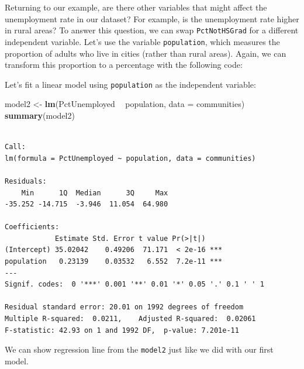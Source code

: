 \documentclass[]{article}
\newenvironment{Shaded}{\begin{snugshade}}{\end{snugshade}}
\newcommand{\DataTypeTok}[1]{\textcolor[rgb]{0.13,0.29,0.53}{#1}}
\newcommand{\DecValTok}[1]{\textcolor[rgb]{0.00,0.00,0.81}{#1}}
\newcommand{\KeywordTok}[1]{\textcolor[rgb]{0.13,0.29,0.53}{\textbf{#1}}}
\newcommand{\NormalTok}[1]{#1}
\newcommand{\OperatorTok}[1]{\textcolor[rgb]{0.81,0.36,0.00}{\textbf{#1}}}
\newcommand{\StringTok}[1]{\textcolor[rgb]{0.31,0.60,0.02}{#1}}
\begin{document}
Returning to our example, are there other variables that might affect the unemployment rate in our dataset? For example, is the unemployment rate higher in rural areas? To answer this question, we can swap \texttt{PctNotHSGrad} for a different independent variable. Let's use the variable \texttt{population}, which measures the proportion of adults who live in cities (rather than rural areas). Again, we can transform this proportion to a percentage with the following code:

\begin{Shaded}
\end{Shaded}

Let's fit a linear model using \texttt{population} as the independent variable:

\begin{Shaded}
\begin{Highlighting}[]
\NormalTok{model2 <-}\StringTok{ }\KeywordTok{lm}\NormalTok{(PctUnemployed }\OperatorTok{~}\StringTok{ }\NormalTok{population, }\DataTypeTok{data =}\NormalTok{ communities)}
\KeywordTok{summary}\NormalTok{(model2)}
\end{Highlighting}
\end{Shaded}

\begin{verbatim}

Call:
lm(formula = PctUnemployed ~ population, data = communities)

Residuals:
    Min      1Q  Median      3Q     Max 
-35.252 -14.715  -3.946  11.054  64.980 

Coefficients:
            Estimate Std. Error t value Pr(>|t|)    
(Intercept) 35.02042    0.49206  71.171  < 2e-16 ***
population   0.23139    0.03532   6.552  7.2e-11 ***
---
Signif. codes:  0 '***' 0.001 '**' 0.01 '*' 0.05 '.' 0.1 ' ' 1

Residual standard error: 20.01 on 1992 degrees of freedom
Multiple R-squared:  0.0211,    Adjusted R-squared:  0.02061 
F-statistic: 42.93 on 1 and 1992 DF,  p-value: 7.201e-11
\end{verbatim}

We can show regression line from the \texttt{model2} just like we did with our first model.
\end{document}

